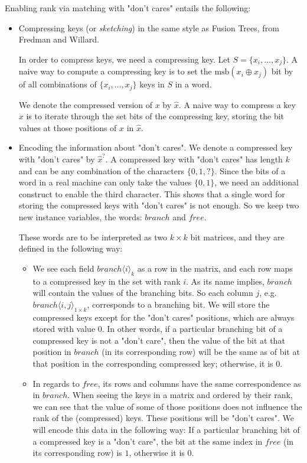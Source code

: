 Enabling rank via matching with "don't cares" entails the following:
\begin{itemize}
    \item
    Compressing keys (or \textit{sketching}) in the same style as Fusion Trees, from Fredman and Willard.
    
    In order to compress keys, we need a compressing key. Let $S = \{x_i, \dots, x_j\}$. A naive way to compute a compressing key is to set the $\text{msb}(x_i \oplus x_j)$ bit by of all combinations of $\{x_i, \dots, x_j\}$ keys in $S$ in a word.
    
    We denote the compressed version of $x$ by $\hat x $. A naive way to compress a key $x$ is to iterate through the set bits of the compressing key, storing the bit values at those positions of $x$ in $\hat x$.
    
    \item
    Encoding the information about "don't cares". We denote a compressed key with "don't cares" by $\hat x^?$. A compressed key with "don't cares" has length $k$ and can be any combination of the characters $\{0, 1, ?\}$. Since the bits of a word in a real machine can only take the values $\{0, 1\}$, we need an additional construct to enable the third character. This shows that a single word for storing the compressed keys with "don't cares" is not enough. So we keep two new instance variables, the words: $branch$ and $free$.
    
    These words are to be interpreted as two $k \times k$ bit matrices, and they are defined in the following way:
    \begin{itemize}
        \item
        We see each field $branch\langle i \rangle_k$ as a row in the matrix, and each row maps to a compressed key in the set with rank $i$.
        As its name implies, $branch$ will contain the values of the branching bits. 
        So each column $j$, e.g. $branch\langle i, j\rangle_{1 \times k}$, corresponds to a branching bit.
        We will store the compressed keys except for the "don't cares" positions, which are always stored with value $0$.
        In other words, if a particular branching bit of a compressed key is not a "don't care", then the value of the bit at that position in $branch$ (in its corresponding row) will be the same as of bit at that position in the corresponding compressed key; otherwise, it is 0.
        
        \item
        In regards to $free$, its rows and columns have the same correspondence as in $branch$.
        When seeing the keys in a matrix and ordered by their rank, we can see that the value of some of those positions does not influence the rank of the (compressed) keys.
        These positions will be "don't cares".
        We will encode this data in the following way: If a particular branching bit of a compressed key is a "don't care", the bit at the same index in $free$ (in its corresponding row) is $1$, otherwise it is $0$.
    \end{itemize}


\end{itemize}
